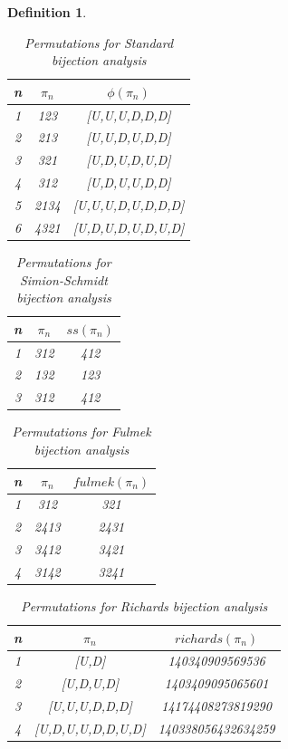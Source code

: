 \documentclass[12pt]{article}
\newtheorem{definition}{Definition}
\begin{document}
\begin{definition}
\begin{table}[H]
\caption{Permutations for Standard bijection analysis}
\centering
\begin{tabular}{c | c c}
\hline\hline
n & $\pi_n$ & $\phi(\pi_n)$ \\ [0.5ex]
\hline
1 & 123 & [U,U,U,D,D,D] \\
2 & 213 & [U,U,D,U,D,D] \\
3 & 321 & [U,D,U,D,U,D] \\
4 & 312 & [U,D,U,U,D,D] \\
5 & 2134 & [U,U,U,D,U,D,D,D] \\
6 & 4321 & [U,D,U,D,U,D,U,D] \\
\hline
\end{tabular}
\label{table:StandardPerms}
\end{table}

\begin{table}[H]
\caption{Permutations for Simion-Schmidt bijection analysis}
\centering
\begin{tabular}{c | c c}
\hline\hline
n & $\pi_n$ & $ss(\pi_n)$ \\ [0.5ex]
\hline
1 & 312 & 412 \\
2 & 132 & 123 \\
3 & 312 & 412 \\
\hline
\end{tabular}
\label{table:SSPerms}
\end{table}

\begin{table}[H]
\caption{Permutations for Fulmek bijection analysis}
\centering
\begin{tabular}{c | c c}
\hline\hline
n & $\pi_n$ & $fulmek(\pi_n)$ \\ [0.5ex]
\hline
1 & 312 & 321 \\
2 & 2413 & 2431\\
3 & 3412 & 3421\\
4 & 3142 & 3241\\
\hline
\end{tabular}
\label{table:FulmekPerms}
\end{table}

\begin{table}[H]
\caption{Permutations for Richards bijection analysis}
\centering
\begin{tabular}{c | c c}
\hline\hline
n & $\pi_n$ & $richards(\pi_n)$ \\ [0.5ex]
\hline
1 & [U,D] & 140340909569536\\
2 & [U,D,U,D] & 1403409095065601\\
3 & [U,U,U,D,D,D] & 14174408273819290\\
4 & [U,D,U,U,D,D,U,D] & 140338056432634259\\
\hline
\end{tabular}
\label{table:Richards}
\end{table}


\end{definition}
\end{document}
